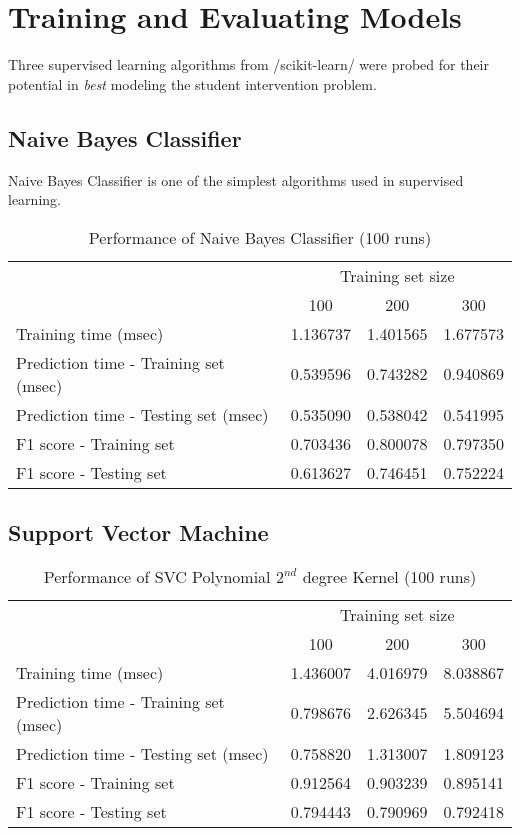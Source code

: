 \documentclass{article}
\begin{document}
	\section{Training and Evaluating Models}
	Three supervised learning algorithms from \pyinl/scikit-learn/ were probed for their potential in \emph{best} modeling the student intervention problem. 
	\subsection{Naive Bayes Classifier}
	Naive Bayes Classifier is one of the simplest algorithms used in supervised learning. 

	\begin{table}[h]
		\centering
		\begin{tabular}{l|ccc}
			\toprule
			{} & \multicolumn{3}{c}{Training set size} \\
			{} &       100 &       200 &       300 \\
			\midrule
			Training time (msec)                  &  1.136737 &  1.401565 &  1.677573 \\
			Prediction time - Training set (msec) &  0.539596 &  0.743282 &  0.940869 \\
			Prediction time - Testing set (msec)  &  0.535090 &  0.538042 &  0.541995 \\
			F1 score - Training set               &  0.703436 &  0.800078 &  0.797350 \\
			F1 score - Testing set                &  0.613627 &  0.746451 &  0.752224 \\
			\bottomrule
		\end{tabular}
		\caption{Performance of Naive Bayes Classifier (100 runs)}
		\label{tab:naive_bayes_100}
	\end{table}
	        
	\subsection{Support Vector Machine}
	\begin{table}[h]
		\centering
		\begin{tabular}{l|ccc}
			\toprule
			{} & \multicolumn{3}{c}{Training set size} \\
			{} &       100 &       200 &       300 \\
			\midrule
			Training time (msec)                  &  1.436007 &  4.016979 &  8.038867 \\
			Prediction time - Training set (msec) &  0.798676 &  2.626345 &  5.504694 \\
			Prediction time - Testing set (msec)  &  0.758820 &  1.313007 &  1.809123 \\
			F1 score - Training set               &  0.912564 &  0.903239 &  0.895141 \\
			F1 score - Testing set                &  0.794443 &  0.790969 &  0.792418 \\
			\bottomrule
		\end{tabular}
		\caption{Performance of SVC Polynomial $2^{nd}$ degree Kernel (100 runs)}
		\label{tab:svc_poly_100}
	\end{table}
	
\end{document}
